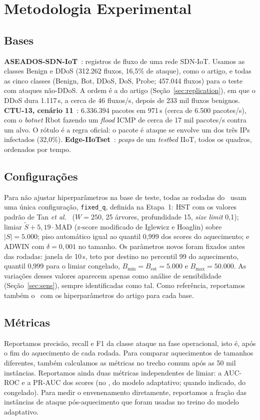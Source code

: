 \section{Metodologia Experimental}
\label{sec:setup}

\subsection{Bases}
\textbf{ASEADOS-SDN-IoT}~\cite{aseados}: registros de fluxo de uma rede SDN-IoT. Usamos as classes
Benign e DDoS (312.262 fluxos, 16,5\% de ataque), como o artigo, e todas as cinco classes (Benign,
Bot, DDoS, DoS, Probe; 457.044 fluxos) para o teste com ataques não-DDoS. A ordem é a do artigo
(Seção~\ref{sec:replication}), em que o DDoS dura 1.117\,s, a cerca de 46 fluxos/s, depois de
233 mil fluxos benignos.
\textbf{CTU-13, cenário 11}~\cite{garcia2014ctu13}: 6.336.394 pacotes em 971\,s (cerca de
6.500 pacotes/s), com o \emph{botnet} Rbot fazendo um \emph{flood} ICMP de cerca de 17 mil
pacotes/s contra um alvo. O rótulo é a regra oficial: o pacote é ataque se envolve um dos três IPs
infectados (32,0\%).
\textbf{Edge-IIoTset}~\cite{ferrag2022edgeiiot}: \emph{pcaps} de um \emph{testbed} IIoT, todos os
quadros, ordenados por tempo.

\subsection{Configurações}
Para não ajustar hiperparâmetros na base de teste, todas as rodadas do \modusp\ usam uma única
configuração, \texttt{fixed\_q}, definida na Etapa~1:
HST com os valores padrão de Tan \emph{et al.}~\cite{tan2011hst} ($W=250$, 25 árvores, profundidade
15, \emph{size limit} 0,1); limiar $\tilde{S} + 5{,}19\cdot\mathrm{MAD}$ (z-score modificado de
Iglewicz e Hoaglin) sobre $|S|=5.000$; piso automático igual ao quantil 0,999 dos scores do
aquecimento; e ADWIN com $\delta=0{,}001$ no tamanho. Os parâmetros novos foram fixados antes das
rodadas: janela de 10\,s, teto por destino no percentil 99 do aquecimento, quantil 0,999 para o
limiar congelado, $B_{\min}=B_{\mathrm{est}}=5.000$ e $B_{\max}=50.000$. As variações desses
valores aparecem apenas como análise de sensibilidade (Seção~\ref{sec:sens}), sempre identificadas
como tal. Como referência, reportamos também o \modus\ com os hiperparâmetros do artigo para cada
base.

\subsection{Métricas}
Reportamos precisão, recall e F1 da classe ataque na fase operacional, isto é, após o fim do
aquecimento de cada rodada. Para comparar aquecimentos de tamanhos diferentes, também calculamos as
métricas no trecho comum após as 50 mil instâncias. Reportamos ainda duas métricas independentes
de limiar: a AUC-ROC e a PR-AUC dos scores (no \modusp, do modelo adaptativo; quando indicado, do
congelado). Para medir o envenenamento diretamente, reportamos a fração das instâncias de ataque
pós-aquecimento que foram usadas no treino do modelo adaptativo.

